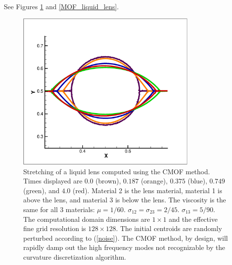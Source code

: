 \documentclass[]{article}
\begin{document}
See Figures 
\ref{CMOF_liquid_lens} and
\ref{MOF_liquid_lens}.

\begin{figure}[htbp]
\centering
\includegraphics[width=0.8\textwidth]{CMOF_lens.eps} 
\caption{Stretching of a liquid lens computed using the CMOF method.  
	Times displayed are $0.0$ (brown), $0.187$ (orange), 
	$0.375$ (blue), $0.749$ (green), and $4.0$ (red).
	Material 2 is the
	lens material, material 1 is above the lens, and
	material 3 is below the lens.  
	The viscosity is the
	same for all 3 materials: $\mu=1/60$.  
	$\sigma_{12}=\sigma_{23}=2/45$.   $\sigma_{13}=5/90$.
        The computational domain dimensions are $1\times 1$ and
	the effective fine grid resolution is $128\times 128$.
	The initial centroids are randomly perturbed according
        to (\ref{noise}).  The CMOF method, by design, will 
        rapidly damp
        out the high frequency modes not recognizable by the
        curvature discretization algorithm.}
 \label{CMOF_liquid_lens}
\end{figure}
\end{document}
